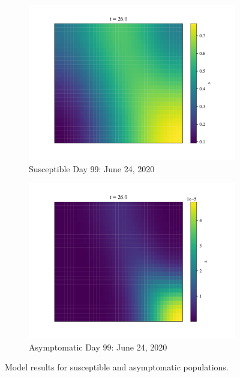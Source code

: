 \documentclass[11pt]{article}
\begin{document}
\begin{figure}[H]
			\begin{subfigure}{0.5\textwidth}
				\includegraphics[width=\textwidth]{susceptible_99}
				\caption{Susceptible Day 99: June 24, 2020}
			\end{subfigure}%
			\begin{subfigure}{0.5\textwidth}
				\includegraphics[width=\textwidth]{asymptomatic_99}
				\caption{Asymptomatic Day 99: June 24, 2020}
			\end{subfigure}
			
			\caption{Model results for susceptible and asymptomatic populations.}
			\label{fig:app-pops}
		\end{figure}



\end{document}
